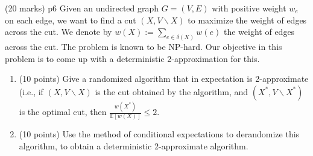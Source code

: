 \documentclass[a4paper, 11pt]{article}
\begin{document}
\begin{problem}{%
 \hfill  (20 marks)
}{p6%
}
Given an undirected graph $G=(V, E)$ with positive weight $w_e$ on each edge, we want to find a cut $(X, V \backslash X)$ to maximize the weight of edges across the cut. We denote by $w(X):=\sum\limits_{e \in \delta(X)} w(e)$ the weight of edges across the cut. The problem is known to be NP-hard. Our objective in this problem is to come up with a deterministic 2-approximation for this.
\begin{enumerate}[label=(\alph*)]
	\item (10 points) Give a randomized algorithm that in expectation is 2-approximate (i.e., if $(X, V \backslash X)$ is the cut obtained by the algorithm, and $\left(X^*, V \backslash X^*\right)$ is the optimal cut, then $\frac{w\left(X^*\right)}{\mathbb{E}[w(X)]} \leq 2$.
	\item (10 points) Use the method of conditional expectations to derandomize this algorithm, to obtain a deterministic 2-approximate algorithm.
\end{enumerate}
\end{problem}
\end{document}
